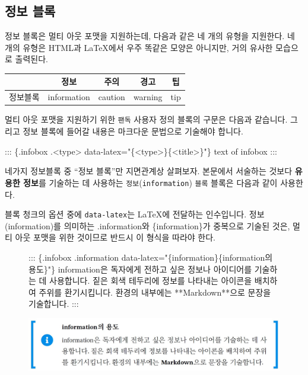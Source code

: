\documentclass[
  letterpaper,
]{book}
\newenvironment{Shaded}{\begin{snugshade}}{\end{snugshade}}
\newcommand{\NormalTok}[1]{\textcolor[rgb]{0.00,0.23,0.31}{#1}}
\begin{document}
\hypertarget{uxc815uxbcf4-uxbe14uxb85d}{%
\subsection{정보 블록}\label{uxc815uxbcf4-uxbe14uxb85d}}

정보 블록은 멀티 아웃 포맷을 지원하는데, 다음과 같은 네
개의 유형을 지원한다. 네 개의 유형은 HTML과 LaTeX에서 우주 똑같은 모양은
아니지만, 거의 유사한 모습으로 출력된다.

\begin{longtable}[]{@{}ccccc@{}}
\toprule\noalign{}
& 정보 & 주의 & 경고 & 팁 \\
\midrule\noalign{}
\endhead
\bottomrule\noalign{}
\endlastfoot
정보블록 & information & caution & warning & tip \\
\end{longtable}

멀티 아웃 포맷을 지원하기 위한 \texttt{팬독} 사용자 정의 블록의 구문은
다음과 같습니다. 그리고 정보 블록에 들어갈 내용은 마크다운 문법으로
기술해야 합니다.

\begin{Shaded}
\begin{Highlighting}[]
\NormalTok{::: \{.infobox .\textless{}type\textgreater{} data{-}latex="\{\textless{}type\textgreater{}\}\{\textless{}title\textgreater{}\}"\}}
\NormalTok{text of infobox}
\NormalTok{:::}
\end{Highlighting}
\end{Shaded}

네가지 정보블록 중 ``정보 블록''만 지면관계상 살펴보자. 본문에서
서술하는 것보다 \textbf{유용한 정보}를 기술하는 데 사용하는
\texttt{정보}(\texttt{information})
\texttt{블록} 블록은 다음과 같이 사용한다.

블록 청크의 옵션 중에 \texttt{data-latex}는 LaTeX에 전달하는 인수입니다.
정보(information)를 의미하는 .information와 \{information\}가 중복으로
기술된 것은, 멀티 아웃 포맷을 위한 것이므로 반드시 이 형식을 따라야
한다.

\begin{figure}

\begin{Shaded}
\begin{Highlighting}[]
\NormalTok{::: \{.infobox .information data{-}latex="\{information\}\{information의 용도\}"\}}
\NormalTok{information은 독자에게 전하고 싶은 정보나 아이디어를 기술하는 데 사용합니다.}
\NormalTok{짙은 회색 테두리에 정보를 나타내는 아이콘을 배치하여 주위를 환기시킵니다.}
\NormalTok{환경의 내부에는 **Markdown**으로 문장을 기술합니다.}
\NormalTok{:::}
\end{Highlighting}
\end{Shaded}

\includegraphics{images/infobox_01_title.jpg}

\end{figure}
\end{document}
